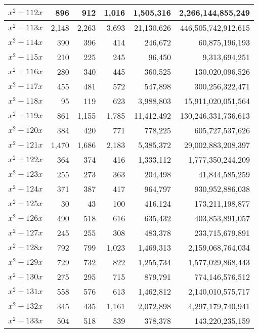 \documentclass[a4paper]{amsproc}
\theoremstyle{plain}
\begin{document}
\begin{longtable}{ | l | r | r | r | r | r | }
$x^2 + 112x$ & 896 & 912 & 1{,}016 & 1{,}505{,}316 & 2{,}266{,}144{,}855{,}249 \\ \hline
$x^2 + 113x$ & 2{,}148 & 2{,}263 & 3{,}693 & 21{,}130{,}626 & 446{,}505{,}742{,}912{,}615 \\ \hline
$x^2 + 114x$ & 390 & 396 & 414 & 246{,}672 & 60{,}875{,}196{,}193 \\ \hline
$x^2 + 115x$ & 210 & 225 & 245 & 96{,}450 & 9{,}313{,}694{,}251 \\ \hline
$x^2 + 116x$ & 280 & 340 & 445 & 360{,}525 & 130{,}020{,}096{,}526 \\ \hline
$x^2 + 117x$ & 455 & 481 & 572 & 547{,}898 & 300{,}256{,}322{,}471 \\ \hline
$x^2 + 118x$ & 95 & 119 & 623 & 3{,}988{,}803 & 15{,}911{,}020{,}051{,}564 \\ \hline
$x^2 + 119x$ & 861 & 1{,}155 & 1{,}785 & 11{,}412{,}492 & 130{,}246{,}331{,}736{,}613 \\ \hline
$x^2 + 120x$ & 384 & 420 & 771 & 778{,}225 & 605{,}727{,}537{,}626 \\ \hline
$x^2 + 121x$ & 1{,}470 & 1{,}686 & 2{,}183 & 5{,}385{,}372 & 29{,}002{,}883{,}208{,}397 \\ \hline
$x^2 + 122x$ & 364 & 374 & 416 & 1{,}333{,}112 & 1{,}777{,}350{,}244{,}209 \\ \hline
$x^2 + 123x$ & 255 & 273 & 363 & 204{,}498 & 41{,}844{,}585{,}259 \\ \hline
$x^2 + 124x$ & 371 & 387 & 417 & 964{,}797 & 930{,}952{,}886{,}038 \\ \hline
$x^2 + 125x$ & 30 & 43 & 100 & 416{,}124 & 173{,}211{,}198{,}877 \\ \hline
$x^2 + 126x$ & 490 & 518 & 616 & 635{,}432 & 403{,}853{,}891{,}057 \\ \hline
$x^2 + 127x$ & 245 & 255 & 308 & 483{,}378 & 233{,}715{,}679{,}891 \\ \hline
$x^2 + 128x$ & 792 & 799 & 1{,}023 & 1{,}469{,}313 & 2{,}159{,}068{,}764{,}034 \\ \hline
$x^2 + 129x$ & 729 & 732 & 822 & 1{,}255{,}734 & 1{,}577{,}029{,}868{,}443 \\ \hline
$x^2 + 130x$ & 275 & 295 & 715 & 879{,}791 & 774{,}146{,}576{,}512 \\ \hline
$x^2 + 131x$ & 558 & 576 & 613 & 1{,}462{,}812 & 2{,}140{,}010{,}575{,}717 \\ \hline
$x^2 + 132x$ & 345 & 435 & 1{,}161 & 2{,}072{,}898 & 4{,}297{,}179{,}740{,}941 \\ \hline
$x^2 + 133x$ & 504 & 518 & 539 & 378{,}378 & 143{,}220{,}235{,}159 \\ \hline

\end{longtable}
\end{document}

